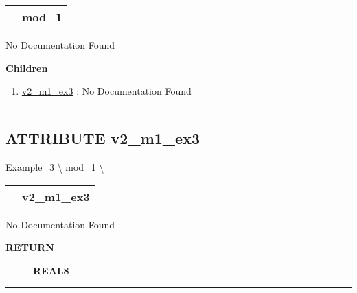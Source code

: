 {\renewcommand{\arraystretch}{1.5}
\begin{tabularx}{\textwidth}{|>{\raggedright\arraybackslash}l|X|}
\hline
\hspace{0pt}\mytexttt{\color{red} } & \textbf{mod\_1} \\
\hline
\end{tabularx}
}

\par





No Documentation Found







\textbf{Children}
\begin{enumerate}
\item \hyperlink{ecldoc:inintest.example_3.mod_1.v2_m1_ex3}{v2\_m1\_ex3}
: No Documentation Found
\end{enumerate}

\rule{\linewidth}{0.5pt}

\subsection*{\textsf{\colorbox{headtoc}{\color{white} ATTRIBUTE}
v2\_m1\_ex3}}

\hypertarget{ecldoc:inintest.example_3.mod_1.v2_m1_ex3}{}
\hspace{0pt} \hyperlink{ecldoc:Inintest.Example_3}{Example_3} \textbackslash 
\hspace{0pt} \hyperlink{ecldoc:Inintest.Example_3.mod_1}{mod_1} \textbackslash 

{\renewcommand{\arraystretch}{1.5}
\begin{tabularx}{\textwidth}{|>{\raggedright\arraybackslash}l|X|}
\hline
\hspace{0pt}\mytexttt{\color{red} } & \textbf{v2\_m1\_ex3} \\
\hline
\end{tabularx}
}

\par





No Documentation Found








\par
\begin{description}
\item [\colorbox{tagtype}{\color{white} \textbf{\textsf{RETURN}}}] \textbf{REAL8} --- 
\end{description}




\rule{\linewidth}{0.5pt}




